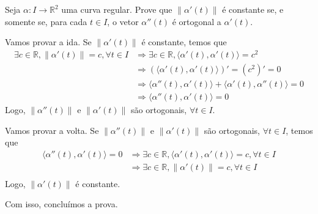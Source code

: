 \documentclass[../main.tex]{subfiles}
\begin{document}
	\begin{exercicio}{9}
		Seja $\alpha\colon I\to \mathbb{R}^2$ uma curva regular. Prove que $\|\alpha'(t)\|$ é constante se, e somente se, para cada $t\in I$, o vetor $\alpha''(t)$ é ortogonal a $\alpha'(t)$.
	\end{exercicio}
	\begin{solucao}
		Vamos provar a ida. Se $\|\alpha'(t)\|$ é constante, temos que  
		\begin{align*}
			\exists c\in \mathbb{R}, \|\alpha'(t)\|=c, \forall t\in I
			&\Rightarrow \exists c\in \mathbb{R}, \langle \alpha'(t), \alpha'(t) \rangle=c^2\\
			&\Rightarrow  (\langle \alpha'(t), \alpha'(t) \rangle)'=(c^2)'=0\\
			&\Rightarrow \langle \alpha''(t), \alpha'(t) \rangle + \langle \alpha'(t), \alpha''(t) \rangle =0\\
			&\Rightarrow \langle \alpha''(t), \alpha'(t) \rangle=0
		\end{align*}
		Logo, $\|\alpha''(t)\|$ e $\|\alpha'(t)\|$ são ortogonais, $\forall t\in I$.
		
		Vamos provar a volta. Se $\|\alpha''(t)\|$ e $\|\alpha'(t)\|$ são ortogonais, $\forall t\in I$, temos que
		\begin{align*}
			\langle \alpha''(t), \alpha'(t) \rangle=0
			&\Rightarrow \exists c\in \mathbb{R}, \langle \alpha'(t), \alpha'(t) \rangle=c, \forall t\in I\\
			&\Rightarrow \exists c\in \mathbb{R}, \|\alpha'(t)\|=c, \forall t\in I\\
		\end{align*}
		Logo, $\|\alpha'(t)\|$ é constante.
		
		Com isso, concluímos a prova.
	\end{solucao}
\end{document}
